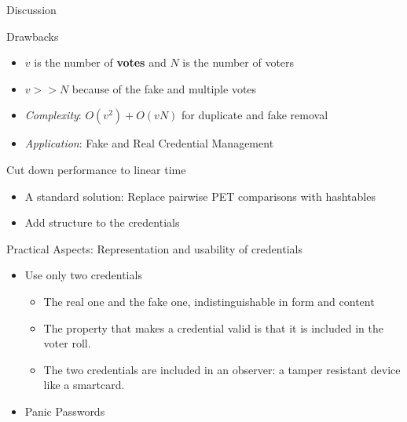 \documentclass{beamer}
\begin{document}
\begin{frame}[allowframebreaks]{Discussion}

\begin{block}{Drawbacks}

\begin{itemize}
\item $v$ is the number of \textbf{votes} and $N$ is the number of voters
\item $ v >> N $ because of the fake and multiple votes
\item \textit{Complexity}: $O(v^2)+O(vN)$ for duplicate and fake removal
\item \textit{Application}: Fake and Real Credential Management
\end{itemize}

\end{block}

\begin{block}{Cut down performance to linear time}

\begin{itemize}
\item A standard solution: Replace pairwise PET comparisons with hashtables
\item Add structure to the credentials
\end{itemize}

\end{block}

\begin{block}{Practical Aspects: Representation and usability of credentials}

\begin{itemize}

\item Use only two credentials \cite{Schweisgut06}

\begin{itemize}
\item The real one and the fake one, indistinguishable in form and content
\item The property that makes a credential valid is that it is included in the voter roll.
\item The two credentials are included in an observer: a tamper resistant device like a smartcard. 
\end{itemize}

\item Panic Passwords

\end{itemize}

\end{block}


\end{frame}
\end{document}
